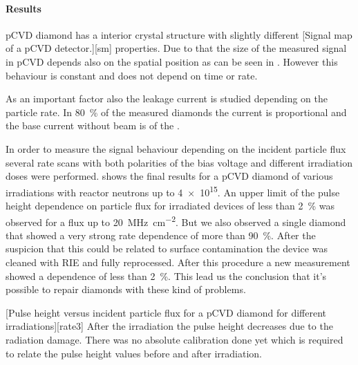 \paragraph{Results}
\ac{pCVD} diamond has a interior crystal structure with slightly different
[Signal map of a \ac{pCVD} detector.][sm]
properties. Due to that the size of the measured signal in \ac{pCVD} depends also on the spatial position as can be seen in . However this behaviour is constant and does not depend on time or rate.\par
As an important factor also the leakage current is studied depending on the particle rate. In \SI{80}{\%} of the measured diamonds the current is proportional and the base current without beam is of the .\par
In order to measure the signal behaviour depending on the incident particle flux several rate scans with both polarities of the bias voltage and different irradiation doses were performed.  shows the final results for a \ac{pCVD} diamond of various irradiations with reactor neutrons up to \SI{4e15}{\ncm}. An upper limit of the pulse height dependence on particle flux for irradiated devices of less than \SI{2}{\%} was observed for a flux up to \SI{20}{\mega\hertz\per cm^2}. %
But we also observed a single diamond that showed a very strong rate dependence of more than \SI{90}{\%}. After the suspicion that this could be related to surface contamination the device was cleaned with \ac{RIE} and fully reprocessed. After this procedure a new measurement showed a dependence of less than \SI{2}{\%}. This lead us the conclusion that it's possible to repair diamonds with these kind of problems.\par
{}[Pulse height versus incident particle flux for a \ac{pCVD} diamond for different irradiations][rate3]
After the irradiation the pulse height decreases due to the radiation damage. There was no absolute calibration done yet which is required to relate the pulse height values before and after irradiation.\par
